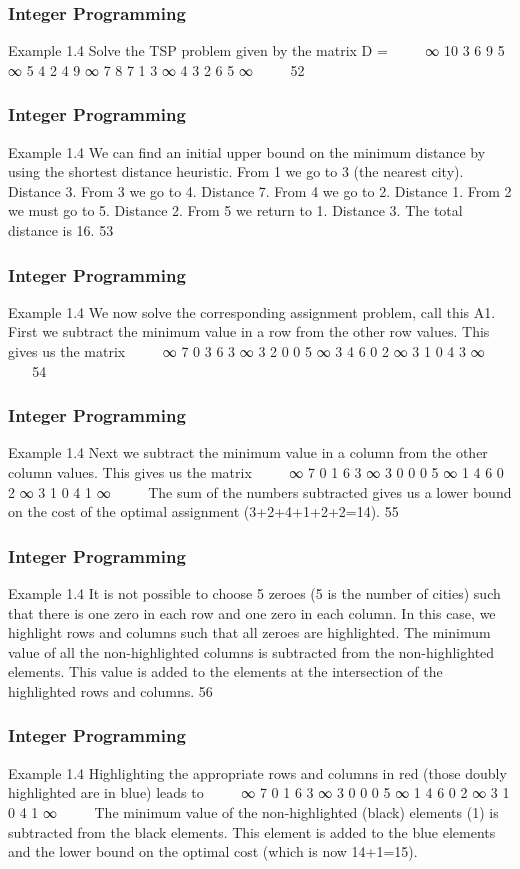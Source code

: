 \begin{frame}
\frametitle{Integer Programming}     
Example 1.4
Solve the TSP problem given by the matrix
D =


∞ 10 3 6 9
5 ∞ 5 4 2
4 9 ∞ 7 8
7 1 3 ∞ 4
3 2 6 5 ∞


52 \end{frame}  \begin{frame} \frametitle{Integer Programming}     
Example 1.4
We can find an initial upper bound on the minimum distance by
using the shortest distance heuristic.
From 1 we go to 3 (the nearest city). Distance 3. From 3 we go to
4. Distance 7.
From 4 we go to 2. Distance 1. From 2 we must go to 5. Distance
2.
From 5 we return to 1. Distance 3. The total distance is 16.
53 \end{frame}  \begin{frame} \frametitle{Integer Programming}     
Example 1.4
We now solve the corresponding assignment problem, call this A1.
First we subtract the minimum value in a row from the other row
values. This gives us the matrix


∞ 7 0 3 6
3 ∞ 3 2 0
0 5 ∞ 3 4
6 0 2 ∞ 3
1 0 4 3 ∞


54 \end{frame}  \begin{frame} \frametitle{Integer Programming}     
Example 1.4
Next we subtract the minimum value in a column from the other
column values. This gives us the matrix


∞ 7 0 1 6
3 ∞ 3 0 0
0 5 ∞ 1 4
6 0 2 ∞ 3
1 0 4 1 ∞


The sum of the numbers subtracted gives us a lower bound on the
cost of the optimal assignment (3+2+4+1+2+2=14).
55 \end{frame}  \begin{frame} \frametitle{Integer Programming}     
Example 1.4
It is not possible to choose 5 zeroes (5 is the number of cities) such
that there is one zero in each row and one zero in each column.
In this case, we highlight rows and columns such that all zeroes are
highlighted.
The minimum value of all the non-highlighted columns is
subtracted from the non-highlighted elements.
This value is added to the elements at the intersection of the
highlighted rows and columns.
56 \end{frame}  \begin{frame} \frametitle{Integer Programming}     
Example 1.4
Highlighting the appropriate rows and columns in red (those
doubly highlighted are in blue) leads to


∞ 7 0 1 6
3 ∞ 3 0 0
0 5 ∞ 1 4
6 0 2 ∞ 3
1 0 4 1 ∞


The minimum value of the non-highlighted (black) elements (1) is
subtracted from the black elements.
This element is added to the blue elements and the lower bound on
the optimal cost (which is now 14+1=15).

\end{frame}
